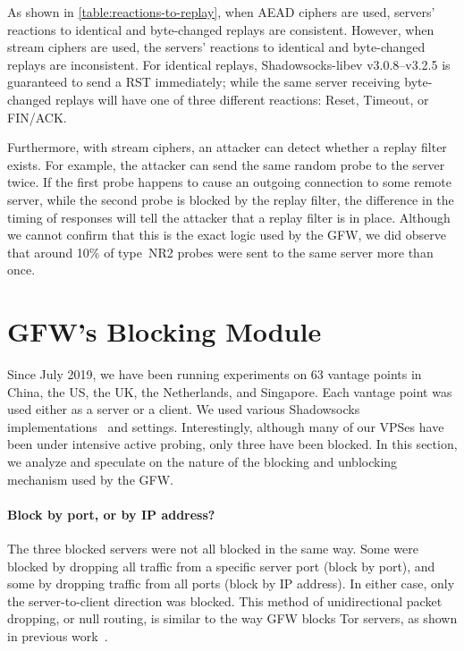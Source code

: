 \documentclass[sigconf,letterpaper]{acmart}
\begin{document}
As shown in \autoref{table:reactions-to-replay},
when AEAD ciphers are used,
servers' reactions to identical and byte-changed replays are consistent.
However, when stream ciphers are used,
the servers' reactions to identical and byte-changed replays are inconsistent.
For identical replays,
Shadowsocks-libev v3.0.8--v3.2.5 is guaranteed to send a RST immediately;
while the same server receiving byte-changed replays will have one of three different reactions: Reset, Timeout, or FIN/ACK.

Furthermore, with stream ciphers,
an attacker can detect whether a replay filter exists.
For example, the attacker can send the same random probe to the server twice.
If the first probe happens to cause an outgoing connection to some remote server,
while the second probe is blocked by the replay filter,
the difference in the timing of responses will tell the attacker
that a replay filter is in place.
Although we cannot confirm that this is the exact logic used by the GFW,
we did observe that around 10\% of type~NR2 probes were sent to the same server more than once.

\section{GFW's Blocking Module}
\label{sec:blocking}

Since July 2019,
we have been running experiments on 63 vantage points in China, the US, the UK, the Netherlands, and Singapore.
Each vantage point was used either as a server or a client.
We used various Shadowsocks implementations~\cite{shadowsocks-libev, outline, shadowsocks-python, shadowsocksr-csharp} and settings.
Interestingly, although many of our VPSes have been under intensive active probing,
only three have been blocked.
In this section,
we analyze and speculate on the nature of the blocking and unblocking mechanism used by the GFW.


\paragraph{Block by port, or by IP address?}
The three blocked servers were not all blocked in the same way.
Some were blocked by dropping all traffic from a specific server port (block by port),
and some by dropping traffic from all ports (block by IP address).
In either case, only the server-to-client direction was blocked.
This method of unidirectional packet dropping, or null routing,
is similar to the way GFW blocks Tor servers,
as shown in previous work~\cite{Winter2012a}.
\end{document}
